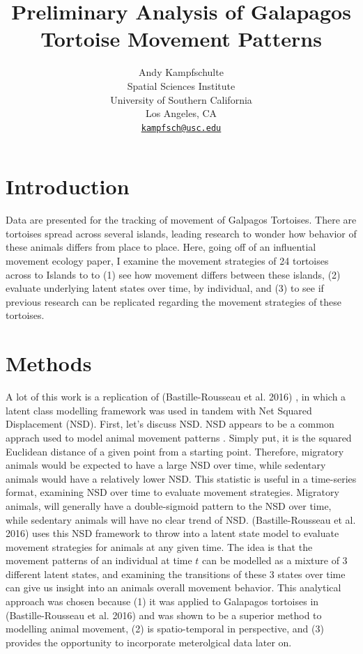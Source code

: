 \documentclass{article}
\title{Preliminary Analysis of Galapagos Tortoise Movement Patterns}
\author{
    Andy Kampfschulte
   \\
    Spatial Sciences Institute \\
    University of Southern California \\
  Los Angeles, CA \\
  \texttt{\href{mailto:kampfsch@usc.edu}{\nolinkurl{kampfsch@usc.edu}}} \\
  }
\begin{document}
\maketitle


\begin{abstract}

\end{abstract}


\hypertarget{introduction}{%
\section{Introduction}\label{introduction}}

Data are presented for the tracking of movement of Galpagos Tortoises.
There are tortoises spread across several islands, leading research to
wonder how behavior of these animals differs from place to place. Here,
going off of an influential movement ecology paper, I examine the
movement strategies of 24 tortoises across to Islands to to (1) see how
movement differs between these islands, (2) evaluate underlying latent
states over time, by individual, and (3) to see if previous research can
be replicated regarding the movement strategies of these tortoises.

\hypertarget{methods}{%
\section{Methods}\label{methods}}

A lot of this work is a replication of (Bastille-Rousseau et al. 2016)
\cite{bastille2016}, in which a latent class modelling framework was
used in tandem with Net Squared Displacement (NSD). First, let's discuss
NSD. NSD appears to be a common apprach used to model animal movement
patterns \cite{netdis1, netdis2, bastille2016}. Simply put, it is the
squared Euclidean distance of a given point from a starting point.
Therefore, migratory animals would be expected to have a large NSD over
time, while sedentary animals would have a relatively lower NSD. This
statistic is useful in a time-series format, examining NSD over time to
evaluate movement strategies. Migratory animals, will generally have a
double-sigmoid pattern to the NSD over time, while sedentary animals
will have no clear trend of NSD. (Bastille-Rousseau et al. 2016) uses
this NSD framework to throw into a latent state model to evaluate
movement strategies for animals at any given time. The idea is that the
movement patterns of an individual at time \(t\) can be modelled as a
mixture of 3 different latent states, and examining the transitions of
these 3 states over time can give us insight into an animals overall
movement behavior. This analytical approach was chosen because (1) it
was applied to Galapagos tortoises in (Bastille-Rousseau et al. 2016)
and was shown to be a superior method to modelling animal movement, (2)
is spatio-temporal in perspective, and (3) provides the opportunity to
incorporate meterolgical data later on.
\end{document}
